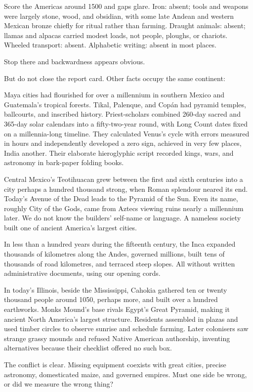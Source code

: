 Score the Americas around 1500 and gaps glare. Iron: absent; tools and weapons were largely stone, wood, and obsidian, with some late Andean and western Mexican bronze chiefly for ritual rather than farming. Draught animals: absent; llamas and alpacas carried modest loads, not people, ploughs, or chariots. Wheeled transport: absent. Alphabetic writing: absent in most places.

Stop there and backwardness appears obvious.

But do not close the report card. Other facts occupy the same continent:

Maya cities had flourished for over a millennium in southern Mexico and Guatemala's tropical forests. Tikal, Palenque, and Copán had pyramid temples, ballcourts, and inscribed history. Priest-scholars combined 260-day sacred and 365-day solar calendars into a fifty-two-year round, with Long Count dates fixed on a millennia-long timeline. They calculated Venus's cycle with errors measured in hours and independently developed a zero sign, achieved in very few places, India another. Their elaborate hieroglyphic script recorded kings, wars, and astronomy in bark-paper folding books.

Central Mexico's Teotihuacan grew between the first and sixth centuries into a city perhaps a hundred thousand strong, when Roman splendour neared its end. Today's Avenue of the Dead leads to the Pyramid of the Sun. Even its name, roughly City of the Gods, came from Aztecs viewing ruins nearly a millennium later. We do not know the builders' self-name or language. A nameless society built one of ancient America's largest cities.

In less than a hundred years during the fifteenth century, the Inca expanded thousands of kilometres along the Andes, governed millions, built tens of thousands of road kilometres, and terraced steep slopes. All without written administrative documents, using our opening cords.

In today's Illinois, beside the Mississippi, Cahokia gathered ten or twenty thousand people around 1050, perhaps more, and built over a hundred earthworks. Monks Mound's base rivals Egypt's Great Pyramid, making it ancient North America's largest structure. Residents assembled in plazas and used timber circles to observe sunrise and schedule farming. Later colonisers saw strange grassy mounds and refused Native American authorship, inventing alternatives because their checklist offered no such box.

The conflict is clear. Missing equipment coexists with great cities, precise astronomy, domesticated maize, and governed empires. Must one side be wrong, or did we measure the wrong thing?


